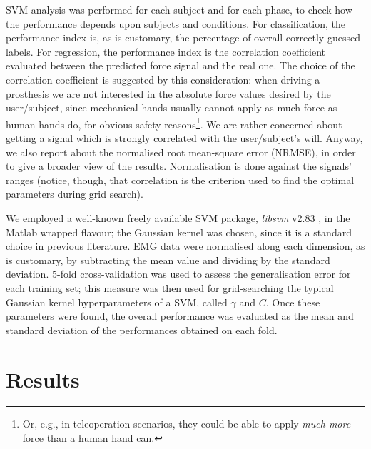 \documentclass[10pt]{bmc_article}
\def\texttt{[image: ]}
\newenvironment{bmcformat}
  {\begin{raggedright}\baselineskip20pt\sloppy\setboolean{publ}{false}}
  {\end{raggedright}\baselineskip20pt\sloppy}
\begin{document}
\begin{bmcformat}
SVM analysis was performed for each subject and for each phase,
to check how the performance depends upon subjects and conditions.
For classification, the performance index is, as is
customary, the percentage of overall correctly guessed labels. For
regression, the performance index is the correlation coefficient
evaluated between the predicted force signal and the real one. The choice
of the correlation coefficient is suggested by this consideration:
when driving a prosthesis we are
not interested in the absolute force values desired by the
user/subject, since mechanical hands usually cannot apply as much
force as human hands do, for obvious safety reasons\footnote{Or, e.g.,
in teleoperation scenarios, they could be able to apply \emph{much
more} force than a human hand can.}. We are rather concerned about
getting a signal which is strongly correlated with the user/subject's will.
Anyway, we also report about the normalised root mean-square error (NRMSE),
in order to give a broader view of the results. Normalisation is done against the
signals' ranges (notice, though, that correlation is the criterion used to
find the optimal parameters during grid search).

We employed a well-known freely available SVM package, \emph{libsvm}
v2.83 \cite{ChangL01}, in the Matlab wrapped flavour; the Gaussian kernel
was chosen, since it is a standard choice in previous literature.
EMG data were normalised along each dimension, as is customary, by subtracting
the mean value and dividing by the standard deviation. $5$-fold cross-validation was
used to assess the generalisation error for each training set; this measure
was then used for grid-searching the typical Gaussian kernel hyperparameters
of a SVM, called $\gamma$ and $C$. Once these parameters were found, the overall
performance was evaluated as the mean and standard deviation of the performances
obtained on each fold.



\section*{Results}
\label{sec:exp}


\end{bmcformat}
\end{document}
